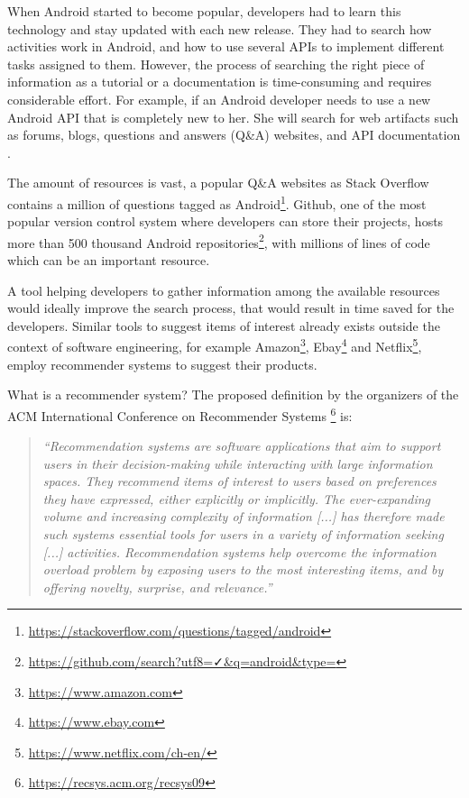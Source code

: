 \documentclass[12pt,mscthesis]{usiinfthesis}
\begin{document}
	When Android started to become popular, developers had to learn this technology and stay updated with each new release.
	They had to search how activities work in Android, and how to use several APIs to implement different tasks assigned to them.
	However, the process of searching the right piece of information as a tutorial or a documentation is time-consuming and requires considerable effort.
	For example, if an Android developer needs to use a new Android API that is completely new to her. She will search for web artifacts such as forums, blogs, questions and answers (Q\&A) websites, and API documentation \cite{Sim:2011:WSE:2063239.2063243}.


	The amount of resources is vast, a popular Q\&A websites as Stack Overflow contains a million of questions tagged as Android\footnote{\url{https://stackoverflow.com/questions/tagged/android}}. Github, one of the most popular version control system where developers can store their projects, hosts more than 500 thousand Android repositories\footnote{\url{https://github.com/search?utf8=✓&q=android&type=}}, with millions of lines of code which can be an important resource.


	A tool helping developers to gather information among the available resources would ideally improve the search process, that would result in time saved for the developers.
	Similar tools to suggest items of interest already exists outside the context of software engineering, for example Amazon\footnote{\url{https://www.amazon.com}}, Ebay\footnote{\url{https://www.ebay.com}} and Netflix\footnote{\url{https://www.netflix.com/ch-en/}}, employ recommender systems to suggest their products.


	What is a recommender system? The proposed definition by the organizers of the ACM International Conference on Recommender Systems \footnote{\url{https://recsys.acm.org/recsys09}} is: \\

	  \blockquote{\textit{``Recommendation systems are software applications that aim to support users in their decision-making while interacting with large information spaces. They recommend items of interest to users based on preferences they have expressed, either explicitly or implicitly. The ever-expanding volume and increasing complexity of information [...] has therefore made such systems essential tools for users in a variety of information seeking [...] activities. Recommendation systems help overcome the information overload problem by exposing users to the most interesting items, and by offering novelty, surprise, and relevance.''}}
\end{document}
